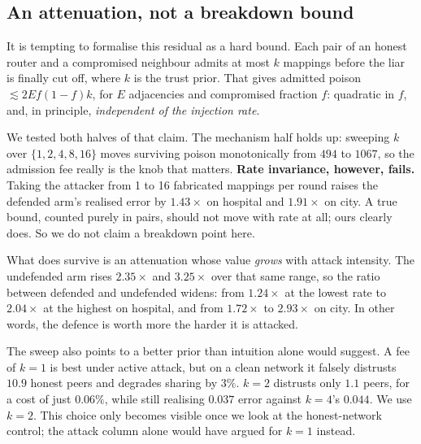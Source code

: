 \documentclass[conference]{IEEEtran}
\begin{document}
		\subsection{An attenuation, not a breakdown bound}
		\label{sec:threat-attenuation}
		
		It is tempting to formalise this residual as a hard bound. Each pair of an
		honest router and a compromised neighbour admits at most $k$ mappings
		before the liar is finally cut off, where $k$ is the trust prior. That
		gives admitted poison $\lesssim 2Ef(1-f)k$, for $E$ adjacencies and
		compromised fraction $f$: quadratic in $f$, and, in principle,
		\emph{independent of the injection rate}.
		
		We tested both halves of that claim. The mechanism half holds up: sweeping
		$k$ over $\{1,2,4,8,16\}$ moves surviving poison monotonically from $494$
		to $1067$, so the admission fee really is the knob that matters.
		\textbf{Rate invariance, however, fails.} Taking the attacker from 1 to 16
		fabricated mappings per round raises the defended arm's realised error by
		$1.43\times$ on hospital and $1.91\times$ on city. A true bound, counted
		purely in pairs, should not move with rate at all; ours clearly does. So we
		do not claim a breakdown point here.
		
		What does survive is an attenuation whose value \emph{grows} with attack
		intensity. The undefended arm rises $2.35\times$ and $3.25\times$ over that
		same range, so the ratio between defended and undefended widens: from
		$1.24\times$ at the lowest rate to $2.04\times$ at the highest on hospital,
		and from $1.72\times$ to $2.93\times$ on city. In other words, the defence
		is worth more the harder it is attacked.
		
		The sweep also points to a better prior than intuition alone would suggest.
		A fee of $k=1$ is best under active attack, but on a clean network it
		falsely distrusts $10.9$ honest peers and degrades sharing by $3\%$. $k=2$
		distrusts only $1.1$ peers, for a cost of just $0.06\%$, while still
		realising $0.037$ error against $k=4$'s $0.044$. We use $k=2$. This choice
		only becomes visible once we look at the honest-network control; the
		attack column alone would have argued for $k=1$ instead.
		
		\balance
		
\end{document}
